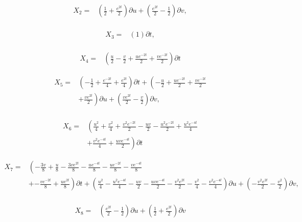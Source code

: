 \begin{align*}
X_{2}=&\left(\frac{1}{2}+\frac{e^{2 t}}{2} \right)\partial u+\left(\frac{e^{2 t}}{2} - \frac{1}{2} \right)\partial v,\\
\end{align*}

\begin{align*}
X_{3}=&\left(1 \right)\partial t,\\
\end{align*}

\begin{align*}
X_{4}=&\left(\frac{u}{2}- \frac{v}{2}+\frac{u e^{- 2 t}}{2}+\frac{v e^{- 2 t}}{2} \right)\partial t
\end{align*}

\begin{align*}
X_{5}=&\left(- \frac{1}{2}+\frac{e^{- 2 t}}{4}+\frac{e^{2 t}}{4} \right)\partial t+\left(- \frac{u}{2}+\frac{u e^{- 2 t}}{2}+\frac{v e^{- 2 t}}{2}\right.\\
&+\left.\frac{v e^{2 t}}{2} \right)\partial u+\left(\frac{v e^{2 t}}{2} - \frac{v}{2} \right)\partial v,\\
\end{align*}

\begin{align*}
X_{6}=&\left(\frac{u^{2}}{4}+\frac{v^{2}}{4}+\frac{v^{2} e^{- 2 t}}{2}- \frac{u v}{2}- \frac{u^{2} e^{- 2 t}}{2}+\frac{u^{2} e^{- 4 t}}{4}\right.\\
&+\left.\frac{v^{2} e^{- 4 t}}{4}+\frac{u v e^{- 4 t}}{2} \right)\partial t
\end{align*}

\begin{align*}
X_{7}=&\left(- \frac{3 v}{8}+\frac{u}{8}- \frac{3 v e^{2 t}}{8}- \frac{u e^{- 4 t}}{8}- \frac{u e^{- 2 t}}{8}- \frac{v e^{- 4 t}}{8}\right.\\
&+\left.- \frac{v e^{- 2 t}}{8}+\frac{u e^{2 t}}{8} \right)\partial t+\left(\frac{u^{2}}{4} - \frac{u^{2} e^{- 4 t}}{4} - \frac{u v}{2} - \frac{u v e^{- 4 t}}{2} - \frac{v^{2} e^{2 t}}{2} - \frac{v^{2}}{4} - \frac{v^{2} e^{- 4 t}}{4} \right)\partial u+\left(- \frac{v^{2} e^{2 t}}{2} - \frac{v^{2}}{2} \right)\partial v,\\
\end{align*}

\begin{align*}
X_{8}=&\left(\frac{e^{2 t}}{2} - \frac{1}{2} \right)\partial u+\left(\frac{1}{2}+\frac{e^{2 t}}{2} \right)\partial v
\end{align*}

